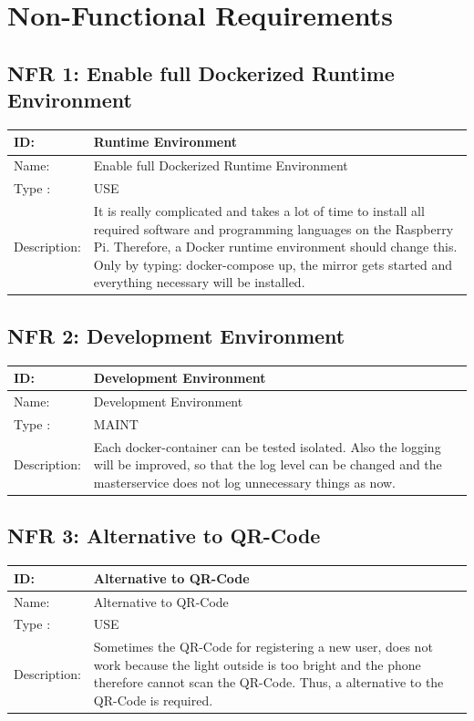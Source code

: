 \documentclass[12pt]{article}
\theoremstyle{definition}
\begin{document}
\pagebreak

\section{Non-Functional Requirements}
\subsection{NFR 1: Enable full Dockerized Runtime Environment}
\begin{tabular}{|p{.2\linewidth}|p{.65\linewidth}|}
\hline 
ID: & Runtime Environment \\ \hline
Name: & Enable full Dockerized Runtime Environment \\ \hline
Type	: & USE\\ \hline
Description: & It is really complicated and takes a lot of time to install all required software and programming languages on the Raspberry Pi. Therefore, a Docker runtime environment should change this. Only by typing: docker-compose up, the mirror gets started and everything necessary will be installed.\\ \hline
\end{tabular}

\subsection{NFR 2: Development Environment}
\begin{tabular}{|p{.2\linewidth}|p{.65\linewidth}|}
\hline 
ID: & Development Environment \\ \hline
Name: & Development Environment \\ \hline
Type	: & MAINT\\ \hline
Description: & Each docker-container can be tested isolated. Also the logging will be improved, so that the log level can be changed and the masterservice does not log unnecessary things as now.\\ \hline
\end{tabular}

\subsection{NFR 3: Alternative to QR-Code}
\begin{tabular}{|p{.2\linewidth}|p{.65\linewidth}|}
\hline 
ID: & Alternative to QR-Code \\ \hline
Name: & Alternative to QR-Code \\ \hline
Type	: & USE\\ \hline
Description: & Sometimes the QR-Code for registering a new user, does not work because the light outside is too bright and the phone therefore cannot scan the QR-Code. Thus, a alternative to the QR-Code is required.\\ \hline
\end{tabular}
\end{document}
